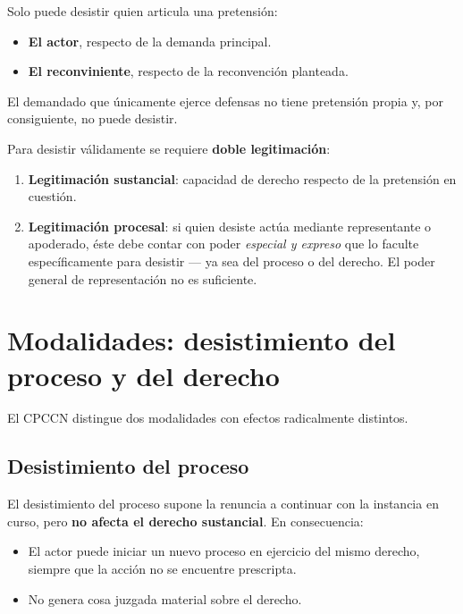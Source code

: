 \documentclass[12pt,oneside]{book}
\begin{document}
Solo puede desistir quien articula una pretensión:

\begin{itemize}
    \item \textbf{El actor}, respecto de la demanda principal.
    \item \textbf{El reconviniente}, respecto de la reconvención planteada.
\end{itemize}

El demandado que únicamente ejerce defensas no tiene pretensión propia y, por consiguiente, no puede desistir.

\begin{important}
Para desistir válidamente se requiere \textbf{doble legitimación}:
\begin{enumerate}
    \item \textbf{Legitimación sustancial}: capacidad de derecho respecto de la pretensión en cuestión.
    \item \textbf{Legitimación procesal}: si quien desiste actúa mediante representante o apoderado, éste debe contar con poder \emph{especial y expreso} que lo faculte específicamente para desistir --- ya sea del proceso o del derecho. El poder general de representación no es suficiente.
\end{enumerate}
\end{important}

\section{Modalidades: desistimiento del proceso y del derecho}

El CPCCN distingue dos modalidades con efectos radicalmente distintos.

\subsection{Desistimiento del proceso}

El desistimiento del proceso supone la renuncia a continuar con la instancia en curso, pero \textbf{no afecta el derecho sustancial}. En consecuencia:

\begin{itemize}
    \item El actor puede iniciar un nuevo proceso en ejercicio del mismo derecho, siempre que la acción no se encuentre prescripta.
    \item No genera cosa juzgada material sobre el derecho.
\end{itemize}
\end{document}
